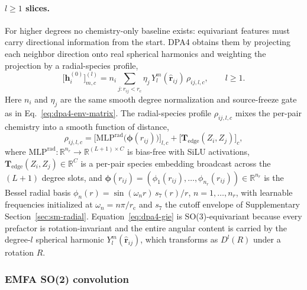 \paragraph{$l\geq 1$ slices.}
For higher degrees no chemistry-only baseline exists: equivariant features must carry directional information from the start.
DPA4 obtains them by projecting
each neighbor direction onto real spherical harmonics and weighting the
projection by a radial-species profile,
\begin{equation}
    \bigl[\mathbf{h}_{i}^{(0)}\bigr]^{(l)}_{m,c}
    =
    n_i\sum_{j:r_{ij}<r_{\mathrm{c}}}
    \eta_j\,Y_l^m(\widehat{\mathbf{r}}_{ij})\,
    \rho_{ij,l,c},\qquad l\geq 1.
    \label{eq:dpa4-gie}
\end{equation}
Here $n_i$ and $\eta_j$ are the same smooth degree normalization and source-freeze gate as in Eq.~\eqref{eq:dpa4-env-matrix}.
The radial-species profile $\rho_{ij,l,c}$
mixes the per-pair chemistry into a smooth function of distance,
\begin{equation}
    \rho_{ij,l,c}
    =
    \bigl[\mathrm{MLP}^{\mathrm{rad}}\!\bigl(\boldsymbol{\phi}(r_{ij})\bigr)\bigr]_{l,c}
    + \bigl[\mathbf{T}_{\mathrm{edge}}(Z_i,Z_j)\bigr]_{c},
    \label{eq:dpa4-rho}
\end{equation}
where $\mathrm{MLP}^{\mathrm{rad}}:\mathbb{R}^{n_r}\to\mathbb{R}^{(L+1)\times C}$ is
bias-free with SiLU activations, $\mathbf{T}_{\mathrm{edge}}(Z_i,Z_j)\in\mathbb{R}^{C}$ is a
per-pair species embedding broadcast across the $(L+1)$ degree slots, and
$\boldsymbol{\phi}(r_{ij})=(\phi_1(r_{ij}),\dots,\phi_{n_r}(r_{ij}))
    \in\mathbb{R}^{n_r}$ is the Bessel radial basis
$\phi_n(r)=\sin(\omega_n r)\,s_7(r)/r$, $n=1,\dots,n_r$, with learnable
frequencies initialized at $\omega_n=n\pi/r_{\mathrm{c}}$ and $s_7$ the cutoff
envelope of Supplementary Section~\ref{sec:sm-radial}.
Equation~\eqref{eq:dpa4-gie} is SO(3)-equivariant because every prefactor is rotation-invariant and the entire angular content is carried by the degree-$l$ spherical harmonic $Y_l^m(\widehat{\mathbf{r}}_{ij})$, which transforms as $D^l(R)$ under a rotation $R$.

\subsubsection{EMFA SO(2) convolution}
\label{sec:so2}

